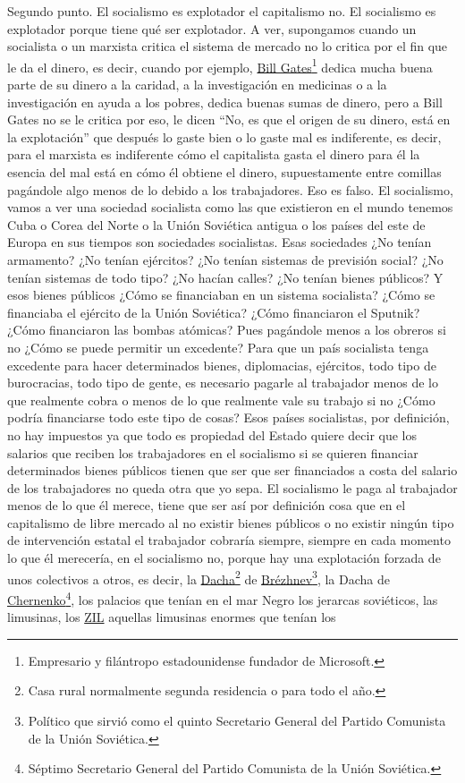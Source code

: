 Segundo punto. El socialismo es explotador el capitalismo no. El socialismo es explotador porque tiene qué ser explotador. A ver, supongamos cuando un socialista o un marxista critica el sistema de mercado no lo critica por el fin que le da el dinero, es decir, cuando por ejemplo, \href{https://en.wikipedia.org/wiki/Bill_Gates}{Bill Gates}\footnote{Empresario y filántropo estadounidense fundador de Microsoft.} dedica mucha buena parte de su dinero a la caridad, a la investigación en medicinas o a la investigación en ayuda a los pobres, dedica buenas sumas de dinero, pero a Bill Gates no se le critica por eso, le dicen \enquote{No, es que el origen de su dinero, está en la explotación} que después lo gaste bien o lo gaste mal es indiferente, es decir, para el marxista es indiferente cómo el capitalista gasta el dinero para él la esencia del mal está en cómo él obtiene el dinero, supuestamente entre comillas pagándole algo menos de lo debido a los trabajadores. Eso es falso. El socialismo, vamos a ver una sociedad socialista como las que existieron en el mundo tenemos Cuba o Corea del Norte o la Unión Soviética antigua o los países del este de Europa en sus tiempos son sociedades socialistas. Esas sociedades ¿No tenían armamento? ¿No tenían ejércitos? ¿No tenían sistemas de previsión social? ¿No tenían sistemas de todo tipo? ¿No hacían calles? ¿No tenían bienes públicos? Y esos bienes públicos ¿Cómo se financiaban en un sistema socialista? ¿Cómo se financiaba el ejército de la Unión Soviética? ¿Cómo financiaron el Sputnik? ¿Cómo financiaron las bombas atómicas? Pues pagándole menos a los obreros si no ¿Cómo se puede permitir un excedente? Para que un país socialista tenga excedente para hacer determinados bienes, diplomacias, ejércitos, todo tipo de burocracias, todo tipo de gente, es necesario pagarle al trabajador menos de lo que realmente cobra o menos de lo que realmente vale su trabajo si no ¿Cómo podría financiarse todo este tipo de cosas? Esos países socialistas, por definición, no hay impuestos ya que todo es propiedad del Estado quiere decir que los salarios que reciben los trabajadores en el socialismo si se quieren financiar determinados bienes públicos tienen que ser que ser financiados a costa del salario de los trabajadores no queda otra que yo sepa. El socialismo le paga al trabajador menos de lo que él merece, tiene que ser así por definición cosa que en el capitalismo de libre mercado al no existir bienes públicos o no existir ningún tipo de intervención estatal el trabajador cobraría siempre, siempre en cada momento lo que él merecería, en el socialismo no, porque hay una explotación forzada de unos colectivos a otros, es decir, la \href{https://en.wikipedia.org/wiki/Dacha}{Dacha}\footnote{Casa rural normalmente segunda residencia o para todo el año.} de \href{https://en.wikipedia.org/wiki/Leonid_Brezhnev}{Brézhnev}\footnote{Político que sirvió como el quinto Secretario General del Partido Comunista de la Unión Soviética.}, la Dacha de \href{https://en.wikipedia.org/wiki/Konstantin_Chernenko}{Chernenko}\footnote{Séptimo Secretario General del Partido Comunista de la Unión Soviética.}, los palacios que tenían en el mar Negro los jerarcas soviéticos, las limusinas, los \href{https://en.wikipedia.org/wiki/ZiL}{ZIL} aquellas limusinas enormes que tenían los 